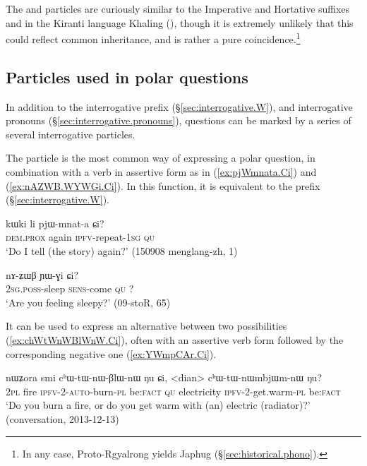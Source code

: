 The  and  particles are curiously similar to the Imperative and Hortative suffixes  and  in the Kiranti language Khaling (\citealt[1114--1123]{jacques12khaling}), though it is extremely unlikely that this could reflect common inheritance, and is rather a pure coincidence.\footnote{In any case, Proto-Rgyalrong  yields Japhug  (§\ref{sec:historical.phono}). }


\subsection{Particles used in polar questions} \label{sec:fsp.interrog}
In addition to the interrogative prefix  (§\ref{sec:interrogative.W}), and interrogative pronouns (§\ref{sec:interrogative.pronouns}), questions can be marked by a series of several interrogative particles.

The particle  is the most common way of expressing a polar question, in combination with a verb in assertive form as in (\ref{ex:pjWmnata.Ci}) and (\ref{ex:nAZWB.WYWGi.Ci}). In this function, it is equivalent to the prefix  (§\ref{sec:interrogative.W}).

\begin{exe}
\ex \label{ex:pjWmnata.Ci}
\gll kɯki li pjɯ-mnat-a ɕi? \\
\textsc{dem}.\textsc{prox} again \textsc{ipfv}-repeat-\textsc{1sg} \textsc{qu} \\
\glt `Do I tell (the story) again?' (150908 menglang-zh, 1)
\end{exe}

\begin{exe}
\ex \label{ex:nAZWB.WYWGi.Ci}
\gll nɤ-ʑɯβ ɲɯ-ɣi ɕi? \\
\textsc{2sg}.\textsc{poss}-sleep \textsc{sens}-come \textsc{qu} ? \\
\glt `Are you feeling sleepy?' (09-stoR,  65)
\end{exe}

It can be used to express an alternative between two possibilities (\ref{ex:chWtWnWBlWnW.Ci}), often with an assertive verb form followed by the corresponding negative one (\ref{ex:YWmpCAr.Ci}).

\begin{exe}
\ex \label{ex:chWtWnWBlWnW.Ci}
\gll nɯʑora smi cʰɯ-tɯ-nɯ-βlɯ-nɯ ŋu ɕi, <dian> cʰɯ-tɯ-nɯmbjɯm-nɯ ŋu? \\
\textsc{2pl} fire \textsc{ipfv}-2-\textsc{auto}-burn-\textsc{pl} be:\textsc{fact} \textsc{qu} electricity \textsc{ipfv}-2-get.warm-\textsc{pl} be:\textsc{fact} \\
\glt `Do you burn a fire, or do you get warm with (an) electric (radiator)?' (conversation, 2013-12-13)
\end{exe}

